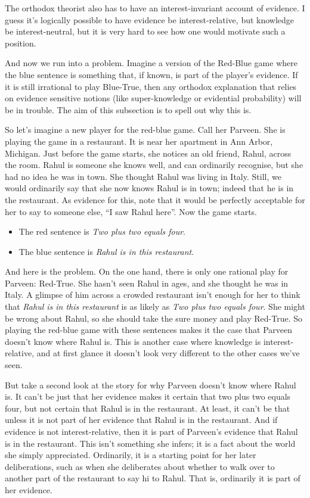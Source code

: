 \documentclass[
  12pt,
  letterpaper,
]{scrbook}
\providecommand{\tightlist}{%
  \setlength{\itemsep}{0pt}\setlength{\parskip}{0pt}}\usepackage{longtable,booktabs,array}
\begin{document}
The orthodox theorist also has to have an interest-invariant account of
evidence. I guess it's logically possible to have evidence be
interest-relative, but knowledge be interest-neutral, but it is very
hard to see how one would motivate such a position.

And now we run into a problem. Imagine a version of the Red-Blue game
where the blue sentence is something that, if known, is part of the
player's evidence. If it is still irrational to play Blue-True, then any
orthodox explanation that relies on evidence sensitive notions (like
super-knowledge or evidential probability) will be in trouble. The aim
of this subsection is to spell out why this is.

So let's imagine a new player for the red-blue game. Call her Parveen.
She is playing the game in a restaurant. It is near her apartment in Ann
Arbor, Michigan. Just before the game starts, she notices an old friend,
Rahul, across the room. Rahul is someone she knows well, and can
ordinarily recognise, but she had no idea he was in town. She thought
Rahul was living in Italy. Still, we would ordinarily say that she now
knows Rahul is in town; indeed that he is in the restaurant. As evidence
for this, note that it would be perfectly acceptable for her to say to
someone else, ``I saw Rahul here''. Now the game starts.

\begin{itemize}
\tightlist
\item
  The red sentence is \emph{Two plus two equals four}.
\item
  The blue sentence is \emph{Rahul is in this restaurant}.
\end{itemize}

And here is the problem. On the one hand, there is only one rational
play for Parveen: Red-True. She hasn't seen Rahul in ages, and she
thought he was in Italy. A glimpse of him across a crowded restaurant
isn't enough for her to think that \emph{Rahul is in this restaurant} is
as likely as \emph{Two plus two equals four}. She might be wrong about
Rahul, so she should take the sure money and play Red-True. So playing
the red-blue game with these sentences makes it the case that Parveen
doesn't know where Rahul is. This is another case where knowledge is
interest-relative, and at first glance it doesn't look very different to
the other cases we've seen.

But take a second look at the story for why Parveen doesn't know where
Rahul is. It can't be just that her evidence makes it certain that two
plus two equals four, but not certain that Rahul is in the restaurant.
At least, it can't be that unless it is not part of her evidence that
Rahul is in the restaurant. And if evidence is not interest-relative,
then it is part of Parveen's evidence that Rahul is in the restaurant.
This isn't something she infers; it is a fact about the world she simply
appreciated. Ordinarily, it is a starting point for her later
deliberations, such as when she deliberates about whether to walk over
to another part of the restaurant to say hi to Rahul. That is,
ordinarily it is part of her evidence.
\end{document}
